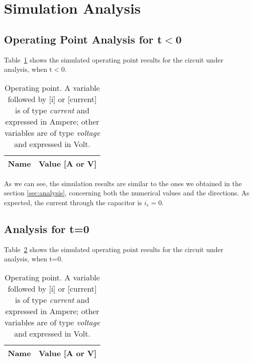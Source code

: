 \section{Simulation Analysis}
\label{sec:simulation}

\subsection{Operating Point Analysis for t$<$0}

\par Table~\ref{tab:op_tb0} shows the simulated operating point results for the circuit
under analysis, when t$<$0.

\begin{table}[H]
  \centering
  \begin{tabular}{|l|r|}
    \hline    
    {\bf Name} & {\bf Value [A or V]} \\ \hline
    
  \end{tabular}
  \caption{Operating point. A variable followed by [i] or [current] is of type {\em current}
    and expressed in Ampere; other variables are of type {\it voltage} and expressed in
    Volt.}
  \label{tab:op_tb0}
\end{table}

\par  As we can see, the simulation results are similar to the ones we obtained in the section \ref{sec:analysis}, concerning both the numerical values and the directions. As expected, the current through the capacitor is $i_c=0$.

\newpage
\subsection{Analysis for t=0}
\label{subsec:t0}  


\par Table~\ref{tab:op_vs0} shows the simulated operating point results for the circuit
under analysis,  when t=0.
\begin{table}[H]
  \centering
  \begin{tabular}{|l|r|}
    \hline    
    {\bf Name} & {\bf Value [A or V]} \\ \hline
    
  \end{tabular}
  \caption{Operating point. A variable followed by [i] or [current] is of type {\em current}
    and expressed in Ampere; other variables are of type {\it voltage} and expressed in
    Volt.}
  \label{tab:op_vs0}
\end{table}


